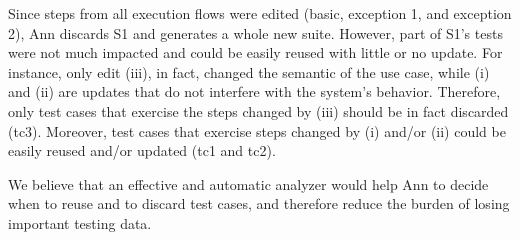 Since steps from all execution flows were edited (basic, exception 1, and exception 2), Ann 
discards S1 and  generates a whole new suite. However, part of S1's tests were not much impacted and could be easily reused with little or no update. For instance, only edit (iii), in fact, changed the semantic of the use case, while (i) and (ii) are updates that do not interfere with the system's behavior. Therefore, only test cases that exercise the steps changed by (iii) should be in fact discarded (tc3). Moreover, test cases that exercise steps changed by (i) and/or (ii) could be easily reused and/or updated (tc1 and tc2). 

We believe that an effective and automatic analyzer would help Ann to decide when to reuse and to discard test cases, and therefore reduce the burden of losing important testing data. 